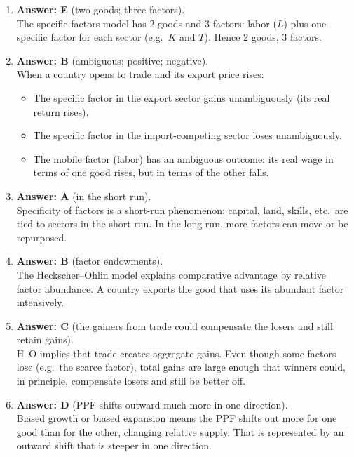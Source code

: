 \documentclass[12pt]{article}
\begin{document}
\begin{enumerate}[label=\textbf{\arabic*.}]
\item \textbf{Answer: E} (two goods; three factors).\\
The specific-factors model has 2 goods and 3 factors: labor ($L$) plus one specific factor for each sector (e.g.\ $K$ and $T$). Hence 2 goods, 3 factors.

\item \textbf{Answer: B} (ambiguous; positive; negative).\\
When a country opens to trade and its export price rises:
\begin{itemize}
\item The specific factor in the export sector gains unambiguously (its real return rises).
\item The specific factor in the import-competing sector loses unambiguously.
\item The mobile factor (labor) has an ambiguous outcome: its real wage in terms of one good rises, but in terms of the other falls.
\end{itemize}

\item \textbf{Answer: A} (in the short run).\\
Specificity of factors is a short-run phenomenon: capital, land, skills, etc.\ are tied to sectors in the short run. In the long run, more factors can move or be repurposed.

\item \textbf{Answer: B} (factor endowments).\\
The Heckscher–Ohlin model explains comparative advantage by relative factor abundance. A country exports the good that uses its abundant factor intensively.

\item \textbf{Answer: C} (the gainers from trade could compensate the losers and still retain gains).\\
H–O implies that trade creates aggregate gains. Even though some factors lose (e.g.\ the scarce factor), total gains are large enough that winners could, in principle, compensate losers and still be better off.

\item \textbf{Answer: D} (PPF shifts outward much more in one direction).\\
Biased growth or biased expansion means the PPF shifts out more for one good than for the other, changing relative supply. That is represented by an outward shift that is steeper in one direction.


\end{enumerate}
\end{document}
